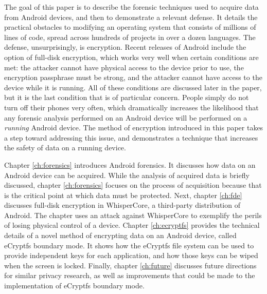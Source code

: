 The goal of this paper is to describe the forensic techniques used to acquire data from Android devices, and
then to demonstrate a relevant defense. It details the practical obstacles to modifying an operating system that consists of
millions of lines of code, spread across hundreds of projects in over a dozen languages.  The defense, unsurprisingly, is
encryption. Recent releases of Android include the option of full-disk encryption, which works very well when certain conditions are
met: the attacker cannot have physical access to the device prior to use, the encryption passphrase must be strong, and the attacker
cannot have access to the device while it is running.  All of these conditions are discussed later in the paper, but it
is the last condition that is of particular concern. People simply do not turn off their phones very often, which dramatically
increases the likelihood that any forensic analysis performed on an Android device will be performed on a \emph{running} Android
device. The method of encryption introduced in this paper takes a step toward addressing this issue, and demonstrates a technique
that increases the safety of data on a running device.

Chapter \ref{ch:forensics} introduces Android forensics. It discusses how data on an Android device can be acquired. While the
analysis of acquired data is briefly discussed, chapter \ref{ch:forensics} focuses on the process of acquisition because that is the
critical point at which data must be protected. Next, chapter \ref{ch:fde} discusses full-disk encryption in WhisperCore, a
third-party distribution of Android. The chapter uses an attack against WhisperCore to exemplify the perils of losing physical
control of a device. Chapter \ref{ch:ecryptfs} provides the technical details of a novel method of encrypting data on an Android
device, called eCryptfs boundary mode. It shows how the eCryptfs file system can be used to provide independent keys for each
application, and how those keys can be wiped when the screen is locked.  Finally, chapter \ref{ch:future} discusses future
directions for similar privacy research, as well as improvements that could be made to the implementation of eCryptfs boundary mode.
